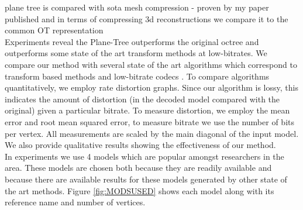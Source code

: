 
plane tree is compared with sota mesh compression - proven by my paper published and in terms of compressing 3d reconstructions we compare it to the common OT representation \\

Experiments reveal the Plane-Tree outperforms the original octree and outperforms some state of the art transform methods at low-bitrates. We compare our method with several state of the art algorithms which correspond to transform based methods \cite{Khodakovsky00Progressive,Bayazit103DMesh} and low-bitrate codecs \cite{Peng10Feature}. To compare algorithms quantitatively, we employ rate distortion graphs. Since our algorithm is lossy, this indicates the amount of distortion (in the decoded model compared with the original) given a particular bitrate. To measure distortion, we employ the mean error and root mean squared error, to measure bitrate we use the number of bits per vertex. All measurements are scaled by the main diagonal of the input model. We also provide qualitative results showing the effectiveness of our method. \\

In experiments we use 4 models which are popular amongst researchers in the area. These models are chosen both because they are readily available and because there are available results for these models generated by other state of the art methods. Figure \ref{fig:MODSUSED} shows each model along with its reference name and number of vertices. \\


